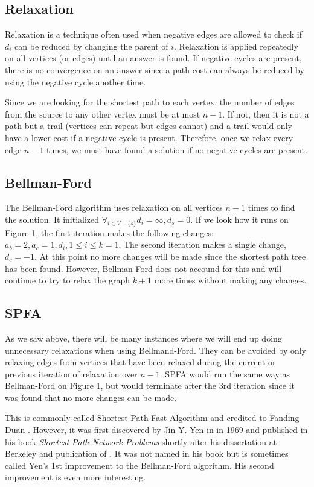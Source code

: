\documentclass{article}
\begin{document}
\subsection{Relaxation}
Relaxation is a technique often used when negative edges are allowed to check if $d_i$ can be reduced by changing the parent of $i$. Relaxation is applied repeatedly on all vertices (or edges) until an answer is found. If negative cycles are present, there is no convergence on an answer since a path cost can always be reduced by using the negative cycle another time.

Since we are looking for the shortest path to each vertex, the number of edges from the source to any other vertex must be at most $n-1$. If not, then it is not a path but a trail (vertices can repeat but edges cannot) and a trail would only have a lower cost if a negative cycle is present. Therefore, once we relax every edge $n-1$ times, we must have found a solution if no negative cycles are present.

\subsection{Bellman-Ford}
The Bellman-Ford algorithm \cite{BF, BF 2} uses relaxation on all vertices $n-1$ times to find the solution. It initialized $\forall_{i\in V-\{s\}} d_i = \infty, d_s = 0$. If we look how it runs on Figure 1, the first iteration makes the following changes: $a_b = 2, a_c = 1, d_{i}, 1 \leq i \leq k = 1$. The second iteration makes a single change, $d_c = -1$. At this point no more changes will be made since the shortest path tree has been found. However, Bellman-Ford does not accound for this and will continue to try to relax the graph $k+1$ more times without making any changes.

\subsection{SPFA}
As we saw above, there will be many instances where we will end up doing unnecessary relaxations when using Bellmand-Ford. They can be avoided by only relaxing edges from vertices that have been relaxed during the current or previous iteration of relaxation over $n-1$. SPFA would run the same way as Bellman-Ford on Figure 1, but would terminate after the 3rd iteration since it was found that no more changes can be made.

This is commonly called Shortest Path Fast Algorithm and credited to Fanding Duan \cite{SPFA}. However, it was first discovered by Jin Y. Yen in in 1969 \cite{Yen2} and published in his book \textit{Shortest Path Network Problems} shortly after his dissertation at Berkeley and publication of \cite{Yen1}. It was not named in his book but is sometimes called Yen's 1st improvement to the Bellman-Ford algorithm. His second improvement is even more interesting.
\end{document}
